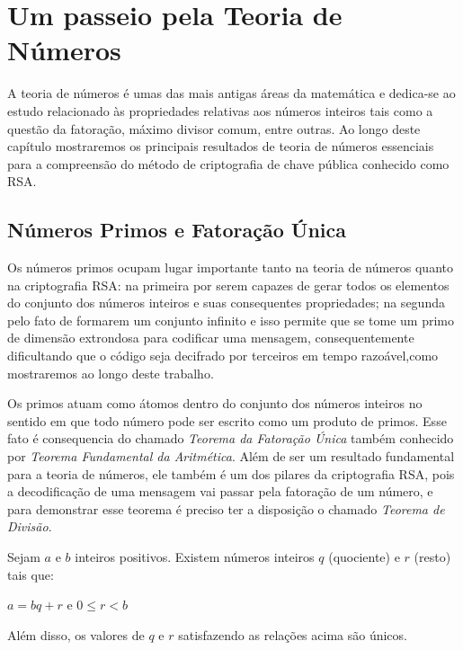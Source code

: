 \chapter {Um passeio pela Teoria de N\'umeros}
\label{Num}

\hspace{7mm}A teoria de n\'umeros \'e umas das mais antigas \'areas da matem\'atica e dedica-se ao estudo relacionado \`as propriedades relativas aos n\'umeros inteiros tais como a quest\~ao da fatora\c{c}\~ao, m\'aximo divisor comum, entre outras. Ao longo deste cap\'itulo mostraremos os principais resultados de teoria de n\'umeros essenciais para a compreens\~ao do m\'etodo de criptografia de chave p\'ublica conhecido como RSA.

\section{N\'umeros Primos e Fatora\c{c}\~ao \'Unica}

\hspace{7mm}Os n\'umeros primos ocupam lugar importante tanto na teoria de n\'umeros quanto na criptografia RSA: na primeira por serem capazes de gerar todos os elementos do conjunto dos n\'umeros inteiros e suas consequentes propriedades; na segunda pelo fato de formarem um conjunto infinito e isso permite que se tome um primo de dimens\~ao extrondosa para codificar uma mensagem, consequentemente dificultando que o c\'odigo seja decifrado por terceiros em tempo razo\'avel,como mostraremos ao longo deste trabalho.

Os primos atuam como \'atomos dentro do conjunto dos n\'umeros inteiros no sentido em que todo n\'umero pode ser escrito como um produto de primos. Esse fato \'e consequencia do chamado \textit{Teorema da Fatora\c{c}\~ao \'Unica} tamb\'em conhecido por \textit{Teorema Fundamental da Aritm\'etica}. Al\'em de ser um resultado fundamental para a teoria de n\'umeros, ele tamb\'em \'e um dos pilares da criptografia RSA, pois a decodifica\c{c}\~ao de uma mensagem vai passar pela fatora\c{c}\~ao de um n\'umero, e para demonstrar esse teorema \'e preciso ter a disposi\c{c}\~ao o chamado \textit{Teorema de Divis\~ao}. 


\begin{Th}
Sejam $a$ e $b$ inteiros positivos. Existem n\'umeros inteiros $q$ (quociente) e $r$ (resto) tais que:	
	\begin{center}
		$a=bq+r$ e $0\leq r <b$
	\end{center}
Al\'em disso, os valores de $q$ e $r$ satisfazendo as rela\c{c}\~oes acima s\~ao \'unicos.
\end{Th} 

